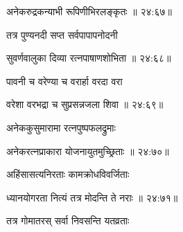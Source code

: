 
{\devanagarifont अनेकरुद्रकन्याभी रूपिणीभिरलङ्कृतः {॥ २४:६७॥} \veg\dontdisplaylinenum }%

{\devanagarifont तत्र पुण्यनदी सप्त सर्वपापापनोदनी \thinspace{\dandab} \dontdisplaylinenum }%
 

{\devanagarifont सुवर्णवालुका दिव्या रत्नपाषाणशोभिता {॥ २४:६८॥} \veg\dontdisplaylinenum }%

{\devanagarifont पावनी च वरेण्या च वरार्हा वरदा वरा \thinspace{\dandab} \dontdisplaylinenum }%


{\devanagarifont वरेशा वरभद्रा च सुप्रसन्नजला शिवा {॥ २४:६९॥} \veg\dontdisplaylinenum }%

{\devanagarifont अनेककुसुमारामा रत्नपुष्पफलद्रुमाः \thinspace{\dandab} \dontdisplaylinenum }%


{\devanagarifont अनेकरत्नप्राकारा योजनायुतमुच्छ्रिताः {॥ २४:७०॥} \veg\dontdisplaylinenum }%

{\devanagarifont अहिंसासत्यनिरताः कामक्रोधविवर्जिताः \thinspace{\dandab} \dontdisplaylinenum }%


{\devanagarifont ध्यानयोगरता नित्यं तत्र मोदन्ति ते नराः {॥ २४:७१॥} \veg\dontdisplaylinenum  }%
 
{\devanagarifont तत्र गोमातरस् सर्वा निवसन्ति यतव्रताः \thinspace{\dandab} \dontdisplaylinenum }%

